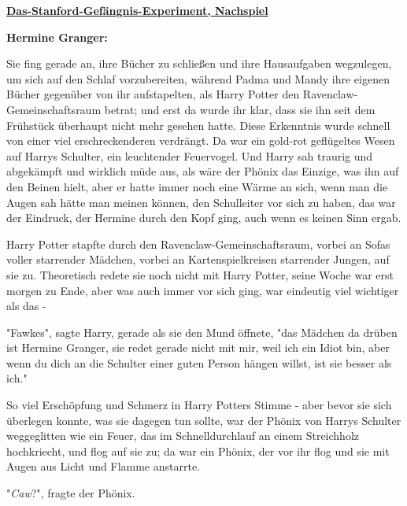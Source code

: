 

\hypertarget{das-stanford-gefuxe4ngnis-experiment-nachspiel}{%

\textbf{\uline{Das-Stanford-Gefängnis-Experiment, Nachspiel}}

\textbf{Hermine Granger:}

Sie fing gerade an, ihre Bücher zu schließen und ihre Hausaufgaben wegzulegen, um sich auf den Schlaf vorzubereiten, während Padma und Mandy ihre eigenen Bücher gegenüber von ihr aufstapelten, als Harry Potter den Ravenclaw-Gemeinschaftsraum betrat; und erst da wurde ihr klar, dass sie ihn seit dem Frühstück überhaupt nicht mehr gesehen hatte. Diese Erkenntnis wurde schnell von einer viel erschreckenderen verdrängt. Da war ein gold-rot geflügeltes Wesen auf Harrys Schulter, ein leuchtender Feuervogel. Und Harry sah traurig und abgekämpft und wirklich müde aus, als wäre der Phönix das Einzige, was ihn auf den Beinen hielt, aber er hatte immer noch eine Wärme an sich, wenn man die Augen sah hätte man meinen können, den Schulleiter vor sich zu haben, das war der Eindruck, der Hermine durch den Kopf ging, auch wenn es keinen Sinn ergab.

Harry Potter stapfte durch den Ravenclaw-Gemeinschaftsraum, vorbei an Sofas voller starrender Mädchen, vorbei an Kartenspielkreisen starrender Jungen, auf sie zu. Theoretisch redete sie noch nicht mit Harry Potter, seine Woche war erst morgen zu Ende, aber was auch immer vor sich ging, war eindeutig viel wichtiger als das -

"Fawkes", sagte Harry, gerade als sie den Mund öffnete, "das Mädchen da drüben ist Hermine Granger, sie redet gerade nicht mit mir, weil ich ein Idiot bin, aber wenn du dich an die Schulter einer guten Person hängen willst, ist sie besser als ich."

So viel Erschöpfung und Schmerz in Harry Potters Stimme - aber bevor sie sich überlegen konnte, was sie dagegen tun sollte, war der Phönix von Harrys Schulter weggeglitten wie ein Feuer, das im Schnelldurchlauf an einem Streichholz hochkriecht, und flog auf sie zu; da war ein Phönix, der vor ihr flog und sie mit Augen aus Licht und Flamme anstarrte.

"\emph{Caw}?", fragte der Phönix.

}
